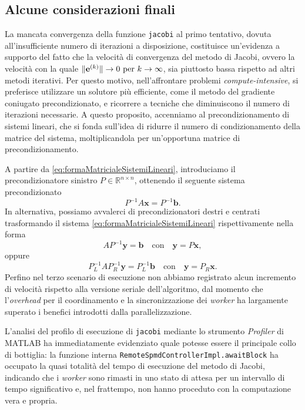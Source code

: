 \subsection{Alcune considerazioni finali}
La mancata convergenza della funzione \lstinline{jacobi} al primo tentativo, dovuta all'insufficiente numero di iterazioni a disposizione, costituisce un'evidenza a supporto del fatto che la velocit\`a di convergenza del metodo di Jacobi, ovvero la velocit\`a con la quale $\lVert\mathbf{e}^{(k)}\rVert  \rightarrow 0 \text{ per } k\rightarrow{\infty}$, sia piuttosto bassa rispetto ad altri metodi iterativi.\newline
Per questo motivo, nell'affrontare problemi \textit{compute-intensive}, si preferisce utilizzare un solutore pi\`u efficiente, come il metodo del gradiente coniugato precondizionato, e ricorrere a tecniche che diminuiscono il numero di iterazioni necessarie. \newline
A questo proposito, accenniamo al precondizionamento di sistemi lineari, che si fonda sull'idea di ridurre il numero di condizionamento della matrice del sistema, moltiplicandola per un'opportuna matrice di precondizionamento.

A partire da \eqref{eq:formaMatricialeSistemiLineari}, introduciamo il precondizionatore sinistro $P\in\mathbb{R}^{n\times n}$, ottenendo il seguente sistema precondizionato
\begin{equation}
    P^{-1}A\mathbf{x} = P^{-1}\mathbf{b}.
\end{equation}
In alternativa, possiamo avvalerci di precondizionatori destri e centrati trasformando il sistema \eqref{eq:formaMatricialeSistemiLineari} rispettivamente nella forma
\begin{equation*}
    AP^{-1}\mathbf{y} = \mathbf{b} \quad \text{con}\quad \mathbf{y} = P\mathbf{x},
\end{equation*}
oppure
\begin{equation*}
   P_{L}^{-1}AP_{R}^{-1}\mathbf{y}=P_{L}^{-1}\mathbf{b} \quad \text{con} \quad \mathbf{y} = P_{R}\mathbf{x}.
\end{equation*}
Perfino nel terzo scenario di esecuzione non abbiamo registrato alcun incremento di velocit\`a rispetto alla versione seriale dell'algoritmo, dal momento che l'\textit{overhead} per il coordinamento e la sincronizzazione dei \textit{worker} ha largamente superato i benefici introdotti dalla parallelizzazione.

L'analisi del profilo di esecuzione di \lstinline{jacobi} mediante lo strumento \textit{Profiler} di MATLAB ha immediatamente evidenziato quale potesse essere il principale collo di bottiglia: la funzione interna \lstinline{RemoteSpmdControllerImpl.awaitBlock} ha occupato la quasi totalit\`a del tempo di esecuzione del metodo di Jacobi, indicando che i \textit{worker} sono rimasti in uno stato di attesa per un intervallo di tempo significativo e, nel frattempo, non hanno proceduto con la computazione vera e propria.

